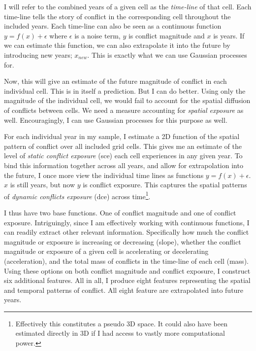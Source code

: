 \documentclass[a4paper]{article}
\begin{document}
I will refer to the combined years of a given cell as the \emph{time-line} of that cell. Each time-line tells the story of conflict in the corresponding cell throughout the included years. Each time-line can also be seen as a continuous function $y = f(x) + \epsilon$ where $\epsilon$ is a noise term, $y$ is conflict magnitude and $x$ is years. If we can estimate this function, we can also extrapolate it into the future by introducing new years; $x_{new}$. This is exactly what we can use Gaussian processes for.\par

Now, this will give an estimate of the future magnitude of conflict in each individual cell. This is in itself a prediction. But I can do better. Using only the magnitude of the individual cell, we would fail to account for the spatial diffusion of conflicts between cells. We need a measure accounting for \emph{spatial exposure} as well. Encouragingly, I can use Gaussian processes for this purpose as well.\par

For each individual year in my sample, I estimate a 2D function of the spatial pattern of conflict over all included grid cells. This gives me an estimate of the level of \emph{static conflict exposure} (sce) each cell experiences in any given year. To bind this information together across all years, and allow for extrapolation into the future, I once more view the individual time lines as functions $y = f(x) + \epsilon$. $x$ is still years, but now $y$ is conflict exposure. This captures the spatial patterns of \emph{dynamic conflicts exposure} (dce) across time\footnote{Effectively this constitutes a pseudo 3D space. It could also have been estimated directly in 3D if I had access to vastly more computational power.}.\par

I thus have two base functions. One of conflict magnitude and one of conflict exposure. Intriguingly, since I am effectively working with continuous functions, I can readily extract other relevant information. Specifically how much the conflict magnitude or exposure is increasing or decreasing (slope), whether the conflict magnitude or exposure of a given cell is accelerating or decelerating (acceleration), and the total mass of conflicts in the time-line of each cell (mass). Using these options on both conflict magnitude and conflict exposure, I construct six additional features. All in all, I produce eight features representing the spatial and temporal patterns of conflict. All eight feature are extrapolated into future years.\par
\end{document}
